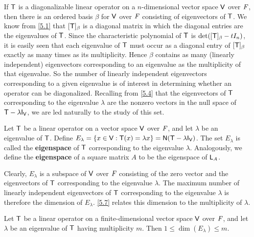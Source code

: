 \begin{note}
  If \(\mathsf{T}\) is a diagonalizable linear operator on a \(n\)-dimensional vector space \(\mathsf{V}\) over \(\mathit{F}\), then there is an ordered basis \(\beta\) for \(\mathsf{V}\) over \(\mathit{F}\) consisting of eigenvectors of \(\mathsf{T}\).
  We know from \cref{5.1} that \([\mathsf{T}]_{\beta}\) is a diagonal matrix in which the diagonal entries are the eigenvalues of \(\mathsf{T}\).
  Since the characteristic polynomial of \(\mathsf{T}\) is \(\det([\mathsf{T}]_{\beta} - t I_n)\), it is easily seen that each eigenvalue of \(\mathsf{T}\) must occur as a diagonal entry of \([\mathsf{T}]_{\beta}\) exactly as many times as its multiplicity.
  Hence \(\beta\) contains as many (linearly independent) eigenvectors corresponding to an eigenvalue as the multiplicity of that eigenvalue.
  So the number of linearly independent eigenvectors corresponding to a given eigenvalue is of interest in determining whether an operator can be diagonalized.
  Recalling from \cref{5.4} that the eigenvectors of \(\mathsf{T}\) corresponding to the eigenvalue \(\lambda\) are the nonzero vectors in the null space of \(\T - \lambda \IT[\V]\), we are led naturally to the study of this set.
\end{note}

\begin{defn}\label{5.2.4}
  Let \(\mathsf{T}\) be a linear operator on a vector space \(\mathsf{V}\) over \(\mathit{F}\), and let \(\lambda\) be an eigenvalue of \(\mathsf{T}\).
  Define \(E_\lambda = \set{x \in \V : \T(x) = \lambda x} = \ns{\T - \lambda \IT[\V]}\).
  The set \(E_\lambda\) is called the \textbf{eigenspace} of \(\mathsf{T}\) corresponding to the eigenvalue \(\lambda\).
  Analogously, we define the \textbf{eigenspace} of a square matrix \(A\) to be the eigenspace of \(\mathsf{L}_A\).
\end{defn}

\begin{note}
  Clearly, \(E_{\lambda}\) is a subspace of \(\mathsf{V}\) over \(\mathit{F}\) consisting of the zero vector and the eigenvectors of \(\mathsf{T}\) corresponding to the eigenvalue \(\lambda\).
  The maximum number of linearly independent eigenvectors of \(\mathsf{T}\) corresponding to the eigenvalue \(\lambda\) is therefore the dimension of \(E_{\lambda}\).
  \cref{5.7} relates this dimension to the multiplicity of \(\lambda\).
\end{note}

\begin{thm}\label{5.7}
  Let \(\mathsf{T}\) be a linear operator on a finite-dimensional vector space \(\mathsf{V}\) over \(\mathit{F}\), and let \(\lambda\) be an eigenvalue of \(\mathsf{T}\) having multiplicity \(m\).
  Then \(1 \leq \dim(E_{\lambda}) \leq m\).
\end{thm}


